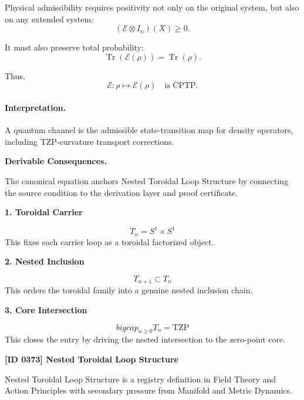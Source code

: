 Physical admissibility requires positivity not only on the original system, but also on any extended system:
\begin{equation}
(\mathcal{E}\otimes I_n)(X)\geq 0 .
\end{equation}

It must also preserve total probability:
\begin{equation}
\operatorname{Tr}(\mathcal{E}(\rho))=\operatorname{Tr}(\rho).
\end{equation}

Thus,
\begin{equation}
\boxed{
\mathcal{E}:\rho\mapsto\mathcal{E}(\rho)
\quad
\text{is CPTP}.
}
\end{equation}

\paragraph{Interpretation.}
A quantum channel is the admissible state-transition map for density operators, including TZP-curvature transport corrections.

\par\vspace{0.35em}
\noindent\textbf{Derivable Consequences.}\quad
\begingroup
\footnotesize
\raggedright
The canonical equation anchors Nested Toroidal Loop Structure by connecting the source condition to the derivation layer and proof certificate.
\par\endgroup

\noindent\textbf{1. Toroidal Carrier}\par
\[
T_n=S^1\times S^1
\]
\noindent This fixes each carrier loop as a toroidal factorized object.\par
\noindent\textbf{2. Nested Inclusion}\par
\[
T_{n+1}\subset T_n
\]
\noindent This orders the toroidal family into a genuine nested inclusion chain.\par
\noindent\textbf{3. Core Intersection}\par
\[
bigcap_{n\geq 0} T_n=\mathrm{TZP}
\]
\noindent This closes the entry by driving the nested intersection to the zero-point core.\par

\clearpage
\noindent\textbf{[ID 0373] Nested Toroidal Loop Structure}\par
\vspace{0.35em}
\begingroup\small
{}
Nested Toroidal Loop Structure is a registry definition in Field Theory and Action Principles with secondary pressure from Manifold and Metric Dynamics.

